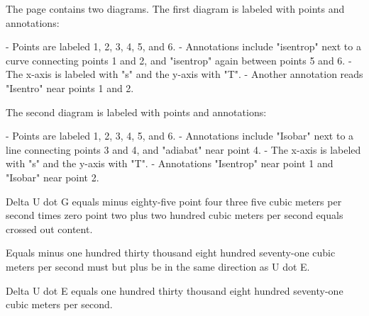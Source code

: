 The page contains two diagrams. The first diagram is labeled with points and annotations: 

- Points are labeled 1, 2, 3, 4, 5, and 6.
- Annotations include "isentrop" next to a curve connecting points 1 and 2, and "isentrop" again between points 5 and 6.
- The x-axis is labeled with "s" and the y-axis with "T".
- Another annotation reads "Isentro" near points 1 and 2.

The second diagram is labeled with points and annotations:

- Points are labeled 1, 2, 3, 4, 5, and 6.
- Annotations include "Isobar" next to a line connecting points 3 and 4, and "adiabat" near point 4.
- The x-axis is labeled with "s" and the y-axis with "T".
- Annotations "Isentrop" near point 1 and "Isobar" near point 2.

Delta U dot G equals minus eighty-five point four three five cubic meters per second times zero point two plus two hundred cubic meters per second equals crossed out content.

Equals minus one hundred thirty thousand eight hundred seventy-one cubic meters per second must but plus be in the same direction as U dot E.

Delta U dot E equals one hundred thirty thousand eight hundred seventy-one cubic meters per second.